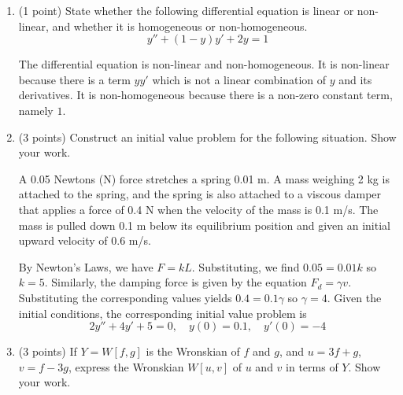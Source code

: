 \documentclass[11pt, titlepage]{article}
\begin{document}
\begin{enumerate}
        \item (1 point) State whether the following differential equation is
            linear or non-linear, and whether it is homogeneous or
            non-homogeneous.
            \[
                y'' + (1-y)y' + 2y = 1
            \] 
            \begin{solution}
                The differential equation is non-linear and non-homogeneous. It
                is non-linear because there is a term $y y'$ which is not a
                linear combination of $y$ and its derivatives. It is
                non-homogeneous because there is a non-zero constant term,
                namely $1$.
            \end{solution}
        \pagebreak

        \item (3 points) Construct an initial value problem for the following
            situation. Show your work.

            A 0.05 Newtons (N) force stretches a spring 0.01 m. A mass weighing
            2 kg is attached to the spring, and the spring is also attached to a
            viscous damper that applies a force of 0.4 N when the velocity of
            the mass is 0.1 m/s. The mass is pulled down 0.1 m below its
            equilibrium position and given an initial upward velocity of 0.6 m/s.

            \begin{solution}
                By Newton's Laws, we have $F = kL$.
                Substituting, we find $0.05 = 0.01 k$ so $k = 5$. Similarly, the
                damping force is given by the equation $F_d = \gamma v$.
                Substituting the corresponding values yields $0.4 = 0.1 \gamma$
                so $\gamma = 4$. Given the initial conditions, the corresponding
                initial value problem is
                \[
                    2y'' + 4y' + 5 = 0, \quad y(0) = 0.1, \quad y'(0) = -4
                \] 
            \end{solution}
        \pagebreak

        \item (3 points) If $Y = W[f, g]$ is the Wronskian of $f$ and $g$, and
            $u = 3f + g$, $v = f - 3g$, express the Wronskian $W[u, v]$ of $u$
            and $v$ in terms of $Y$. Show your work.


\end{enumerate}
\end{document}
